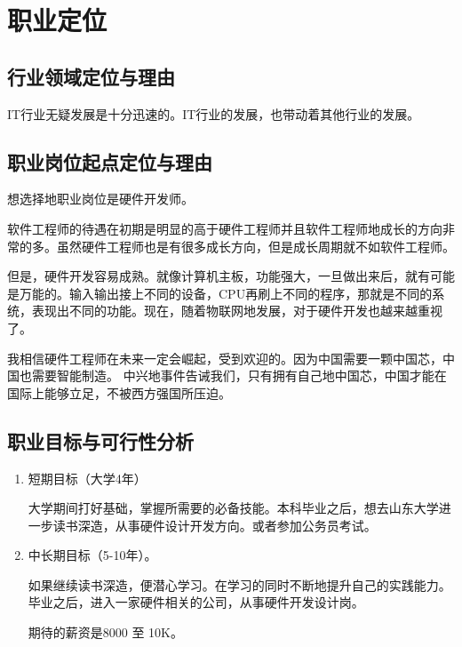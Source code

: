 \documentclass{article}
\begin{document}
\section{职业定位}
\subsection{行业领域定位与理由}
IT行业无疑发展是十分迅速的。IT行业的发展，也带动着其他行业的发展。
\par
\subsection{职业岗位起点定位与理由}
想选择地职业岗位是硬件开发师。\par
软件工程师的待遇在初期是明显的高于硬件工程师并且软件工程师地成长的方向非常的多。虽然硬件工程师也是有很多成长方向，但是成长周期就不如软件工程师。\par
但是，硬件开发容易成熟。就像计算机主板，功能强大，一旦做出来后，就有可能是万能的。输入输出接上不同的设备，CPU再刷上不同的程序，那就是不同的系统，表现出不同的功能。现在，随着物联网地发展，对于硬件开发也越来越重视了。\par
我相信硬件工程师在未来一定会崛起，受到欢迎的。因为中国需要一颗中国芯，中国也需要智能制造。
中兴地事件告诫我们，只有拥有自己地中国芯，中国才能在国际上能够立足，不被西方强国所压迫。\par

\subsection{职业目标与可行性分析}
\begin{enumerate}[(1)]
	\item 短期目标（大学4年）\par
	大学期间打好基础，掌握所需要的必备技能。本科毕业之后，想去山东大学进一步读书深造，从事硬件设计开发方向。或者参加公务员考试。
	\item 中长期目标（5-10年）。\par
	如果继续读书深造，便潜心学习。在学习的同时不断地提升自己的实践能力。毕业之后，进入一家硬件相关的公司，从事硬件开发设计岗。\par
	期待的薪资是8000 至 10K。
\end{enumerate}
\newpage
\end{document}
